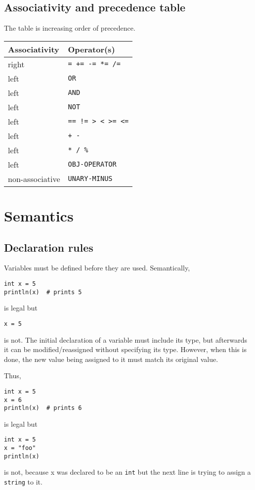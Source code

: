 \documentclass{article}
\begin{document}
\subsection{Associativity and precedence table}
The table is increasing order of precedence.

\begin{table}[h]
\centering
\begin{tabular}{|l|l|}
\hline
Associativity   & Operator(s) \\ \hline
right           & \texttt{= += -= *= /=} \\ \hline
left            & \texttt{OR} \\ \hline
left            & \texttt{AND} \\ \hline
left            & \texttt{NOT} \\ \hline
left            & \texttt{== != > < >= <=} \\ \hline
left            & \texttt{+ -} \\ \hline
left            & \texttt{* / \%} \\ \hline
left            & \texttt{OBJ-OPERATOR} \\ \hline
non-associative & \texttt{UNARY-MINUS} \\
\hline
\end{tabular}
\end{table}

\section{Semantics}
\subsection{Declaration rules}
Variables must be defined before they are used. Semantically,
\begin{verbatim}
int x = 5
println(x)  # prints 5
\end{verbatim}
is legal but 
\begin{verbatim}
x = 5
\end{verbatim}
is not. The initial declaration of a variable must include its type, but afterwards it can be modified/reassigned without specifying its type. However, when this is done, the new value being assigned to it must match its original value.

Thus,
\begin{verbatim}
int x = 5
x = 6
println(x)  # prints 6
\end{verbatim}
is legal but
\begin{verbatim}
int x = 5
x = "foo"
println(x)
\end{verbatim}
is not, because x was declared to be an \texttt{int} but the next line is trying to assign a \texttt{string} to it.
\end{document}
